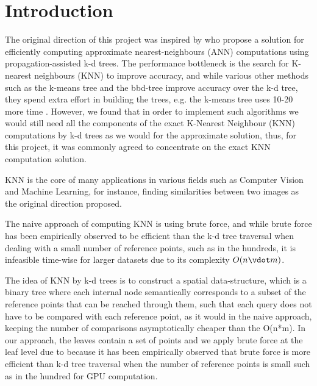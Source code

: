 \section{Introduction}
\label{sec:intro}




The original direction of this project was inspired by \cite{kdann} who propose a solution for efficiently computing approximate nearest-neighbours (ANN) computations using propagation-assisted k-d trees. The performance bottleneck is the search for K-nearest neighbours (KNN) to improve accuracy, and while various other methods such as the k-means tree and the bbd-tree improve accuracy over the k-d tree, they spend extra effort in building the trees, e.g. the k-means tree uses 10-20 more time \cite{kdann}. However, we found that in order to implement such algorithms we would still need all the components of the exact K-Nearest Neighbour (KNN) computations by k-d trees as we would for the approximate solution, thus, for this project, it was commonly agreed to concentrate on the exact KNN computation solution. 


KNN is the core of many applications in various fields such as Computer Vision and Machine Learning, for instance, finding similarities between two images as the original direction proposed. 

The naive approach of computing KNN is using brute force, and while brute force has been empirically observed to be efficient than the k-d tree traversal when dealing with a small number of reference points, such as in the hundreds, it is infeasible time-wise for larger datasets due to its complexity $O(n\vdot m)$. 

The idea of KNN by k-d trees is to construct a spatial data-structure, which is a binary tree where each internal node semantically corresponds to a subset of the reference points that can be reached through them, such that each query does not have to be compared with each reference point, as it would in the naive approach, keeping the number of comparisons asymptotically cheaper than the O(n*m). In our approach, the leaves contain a set of points and we apply brute force at the leaf level due to because it has been empirically observed that brute force is more efficient than k-d tree traversal when the number of reference points is small such as in the hundred for GPU computation. 

